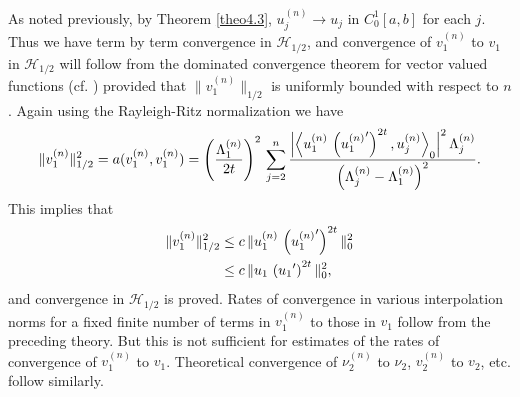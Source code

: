 \documentclass[final]{siamltex}
\numberwithin{equation}{section}
\begin{document}
As noted previously, by Theorem \ref{theo4.3}, $u_j^{(n)} \to u_j$ in $C_0^1[a,b]$ for each $j$. Thus we have term by term convergence in $\mathcal{H}_{1/2}$, and convergence of $v_1^{(n)}$ to $v_1$ in $\mathcal{H}_{1/2}$ will follow from the dominated convergence theorem for vector valued functions (cf. \cite{Dunford-Schwartz}) provided that $\|v_1^{(n)}\|_{1/2}$ is uniformly bounded with respect to $n$.
Again using the Rayleigh-Ritz normalization we have
\begin{equation}
\|v_1^{(n)}\|_{1/2}^2 = a(v_1^{(n)}, v_1^{(n)}) =
\left(\frac{\Lambda_1^{(n)}}{2t}\right)^2 \, \displaystyle{\sum_{j=2}^{n} \frac{\Big|\Big\langle u_1^{(n)} \, \left({u_1^{(n)}}'\right)^{2t}, u_j^{(n)} \Big\rangle_0\Big|^2 \, \Lambda_j^{(n)}}{\left(\Lambda_j^{(n)} - \Lambda_1^{(n)}\right)^2}}. \notag
\end{equation}
This implies that
\begin{align}
\|v_1^{(n)}\|_{1/2}^2 & \le c \, \|u_1^{(n)} \, \left({u_1^{(n)}}'\right)^{2t}\|_{0}^2 \notag \\
& \le c \, \|u_1 \, \left({u_1}'\right)^{2t}\|_{0}^2,
\notag \end{align}
and convergence in $\mathcal{H}_{1/2}$ is proved. Rates of convergence in various interpolation norms for a fixed finite number of terms in $v_1^{(n)}$ to those in $v_1$ follow from the preceding theory. But this is not sufficient for estimates of the rates of convergence of $v_1^{(n)}$ to $v_1$. Theoretical convergence of $\nu_2^{(n)}$ to $\nu_2$, $v_2^{(n)}$ to $v_2$, etc. follow similarly.
\end{document}
